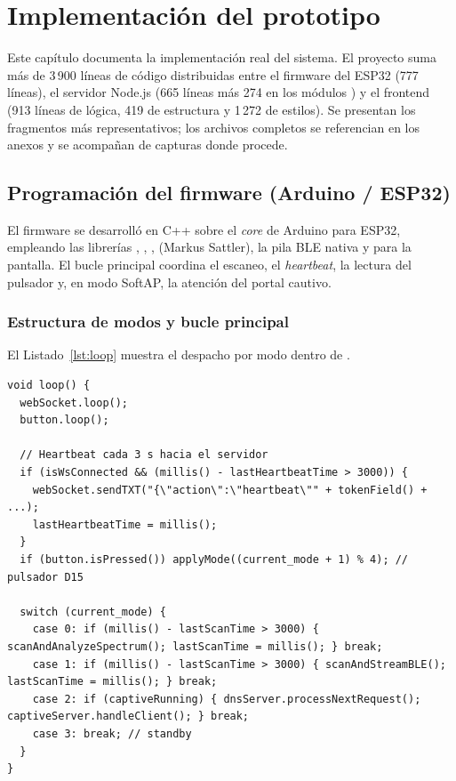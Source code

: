 \chapter{Implementación del prototipo}
\label{cap:implementacion}

Este capítulo documenta la implementación real del sistema. El proyecto suma más de 3\,900 líneas de código distribuidas entre el firmware del ESP32 (777 líneas), el servidor Node.js (665 líneas más 274 en los módulos ) y el frontend (913 líneas de lógica, 419 de estructura y 1\,272 de estilos). Se presentan los fragmentos más representativos; los archivos completos se referencian en los anexos y se acompañan de capturas donde procede.

\section{Programación del firmware (Arduino / ESP32)}
El firmware se desarrolló en C++ sobre el \emph{core} de Arduino para ESP32, empleando las librerías , , ,  (Markus Sattler), la pila BLE nativa y  para la pantalla. El bucle principal coordina el escaneo, el \emph{heartbeat}, la lectura del pulsador y, en modo SoftAP, la atención del portal cautivo.

\subsection{Estructura de modos y bucle principal}
El Listado~\ref{lst:loop} muestra el despacho por modo dentro de .

\begin{lstlisting}[style=cpp,caption={Bucle principal y despacho por modo (firmware)},label={lst:loop}]
void loop() {
  webSocket.loop();
  button.loop();

  // Heartbeat cada 3 s hacia el servidor
  if (isWsConnected && (millis() - lastHeartbeatTime > 3000)) {
    webSocket.sendTXT("{\"action\":\"heartbeat\"" + tokenField() + ...);
    lastHeartbeatTime = millis();
  }
  if (button.isPressed()) applyMode((current_mode + 1) % 4); // pulsador D15

  switch (current_mode) {
    case 0: if (millis() - lastScanTime > 3000) { scanAndAnalyzeSpectrum(); lastScanTime = millis(); } break;
    case 1: if (millis() - lastScanTime > 3000) { scanAndStreamBLE();      lastScanTime = millis(); } break;
    case 2: if (captiveRunning) { dnsServer.processNextRequest(); captiveServer.handleClient(); } break;
    case 3: break; // standby
  }
}
\end{lstlisting}

